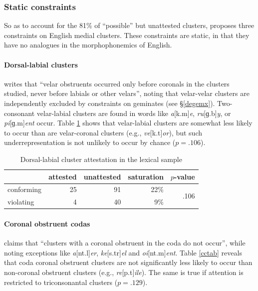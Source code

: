 \subsubsection{Static constraints}

So as to account for the 81\% of ``possible'' but unattested clusters, \citet{Pierrehumbert1994} proposes three constraints on English medial clusters. These constraints are static, in that they have no analogues in the morphophonemics of English.

\paragraph{Dorsal-labial clusters} 
\citet[173]{Pierrehumbert1994} writes that ``velar obstruents occurred only before coronals in the clusters studied, never before labials or other velars'', noting that velar-velar clusters are independently excluded by constraints on geminates (see \S\ref{degemx}). 
Two-consonant velar-labial clusters are found in words like \emph{a}[k.m]\emph{e}, \emph{ru}[ɡ.b]\emph{y}, or \emph{pi}[ɡ.m]\emph{ent} occur. 
Table \ref{dltab} shows that velar-labial clusters are somewhat less likely to occur than  are velar-coronal clusters (e.g., \emph{ve}[k.t]\emph{or}), but such underrepresentation is not unlikely to occur by chance ($p = .106$).

\begin{table}[ht]
\centering
\begin{tabular}{l rrrr}
\toprule
           & attested & unattested & saturation & $p$-value \\
\midrule
conforming & 25       & 91         & 22\%       & \multirow{2}{*}{.106} \\
violating  &  4       & 40         &  9\%       \\
\bottomrule
\end{tabular}
\caption{Dorsal-labial cluster attestation in the lexical sample}
\label{dltab}
\end{table}

\paragraph{Coronal obstruent codas} 
\citet[175]{Pierrehumbert1994} claims that ``clusters with a coronal obstruent in the coda do not occur'', while noting exceptions like \emph{a}[nt.l]\emph{er}, \emph{ke}[s.tr]\emph{el} and \emph{oi}[nt.m]\emph{ent}. 
Table \ref{cctab} reveals that coda coronal obstruent clusters are not significantly less likely to occur than non-coronal obstruent clusters (e.g., \emph{re}[p.t]\emph{ile}). 
The same is true if attention is restricted to triconsonantal clusters ($p = .129$).

